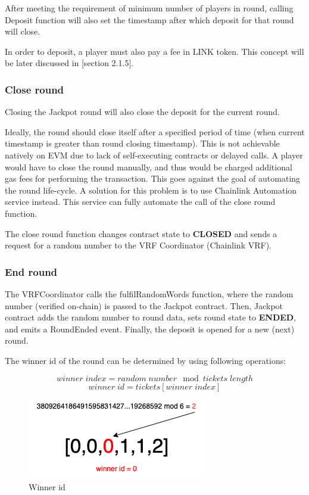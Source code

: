 \documentclass[12pt]{article}
\begin{document}
After meeting the requirement of minimum number of players in round, calling Deposit function will also set the timestamp after which deposit for that round will close.

In order to deposit, a player must also pay a fee in LINK token. This concept will be later discussed in [section 2.1.5].

\subsubsection{Close round}

Closing the Jackpot round will also close the deposit for the current round.

Ideally, the round should close itself after a specified period of time (when current timestamp is greater than round closing timestamp). This is not achievable natively on EVM due to lack of self-executing contracts or delayed calls. A player would have to close the round manually, and thus would be charged additional gas fees for performing the transaction. This goes against the goal of automating the round life-cycle.
A solution for this problem is to use Chainlink Automation service instead. This service can fully automate the call of the close round function.

\hfill

The close round function changes contract state to \textbf{CLOSED} and sends a request for a random number to the VRF Coordinator (Chainlink VRF).

\subsubsection{End round}
The VRFCoordinator calls the fulfilRandomWords function, where the random number (verified on-chain) is passed to the Jackpot contract. Then, Jackpot contract adds the random number to round data, sets round state to \textbf{ENDED}, and emits a RoundEnded event. Finally, the deposit is opened for a new (next) round.

The winner id of the round can be determined by using following operations:

\[ winner\;index = random\;number\mod tickets\;length \]
\[ winner\;id = tickets[winner\;index] \]

\begin{figure}[!ht]
    \centering
    \includegraphics[scale=0.8]{images/winnerId.png} 
    \caption{Winner id}
    \label{fig:b1}
\end{figure}
\FloatBarrier
\end{document}
